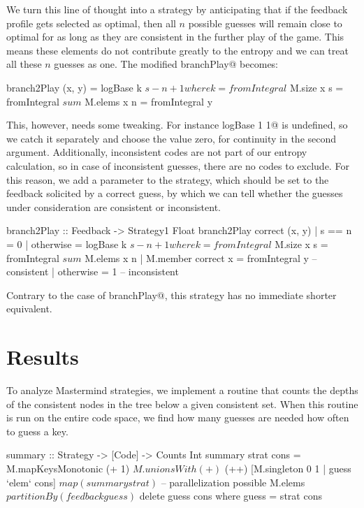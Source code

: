 \documentclass[a4paper]{article}
\makeatletter
\theoremstyle{definition}
\newcommand{\cmd}[1]{\Verb@#1@}
\newcommand{\strategy}[1]{\marginpar{\bigskip\cmd{#1}}}
\makeatother
\begin{document}
We turn this line of thought into a strategy by anticipating that if the feedback profile gets selected as optimal, then all $n$ possible guesses will remain close to optimal for as long as they are consistent in the further play of the game.
This means these elements do not contribute greatly to the entropy and we can treat all these $n$ guesses as one.
The modified \cmd{branchPlay} becomes:
\begin{spec}
branch2Play (x, y) = logBase k $ s - n + 1
  where k = fromIntegral $ M.size x
        s = fromIntegral $ sum $ M.elems x
        n = fromIntegral y
\end{spec}
This, however, needs some tweaking.
For instance \cmd{logBase 1 1} is undefined, so we catch it separately and choose the value zero, for continuity in the second argument.
Additionally, inconsistent codes are not part of our entropy calculation, so in case of inconsistent guesses, there are no codes to exclude.
For this reason, we add a parameter to the strategy, which should be set to the feedback solicited by a correct guess, by which we can tell whether the guesses under consideration are consistent or inconsistent.
\strategy{branch2Play}

\begin{code}
branch2Play :: Feedback -> Strategy1 Float
branch2Play correct (x, y)
  | s == n    = 0
  | otherwise = logBase k $ s - n + 1
  where
    k = fromIntegral $ M.size x
    s = fromIntegral $ sum $ M.elems x
    n | M.member correct x = fromIntegral y -- consistent
      | otherwise          = 1              -- inconsistent
\end{code}

Contrary to the case of \cmd{branchPlay}, this strategy has no immediate shorter equivalent.


\section*{Results}

To analyze Mastermind strategies, we implement a routine that counts the depths of the consistent nodes in the tree below a given consistent set.
When this routine is run on the entire code space, we find how many guesses are needed how often to guess a key.

\begin{code}
summary :: Strategy -> [Code] -> Counts Int
summary strat cons =
  M.mapKeysMonotonic (+ 1) $
  M.unionsWith (+) $
  (++) [M.singleton 0 1 | guess `elem` cons] $
  map (summary strat) $  -- parallelization possible
  M.elems $
  partitionBy (feedback guess) $
  delete guess cons
  where guess = strat cons
\end{code}
\end{document}
